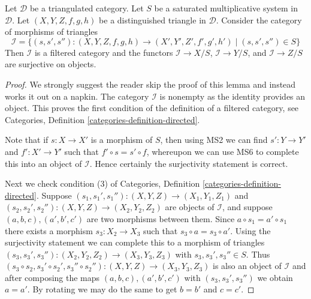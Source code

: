 \begin{lemma}
\label{lemma-limit-triangles}
Let $\mathcal{D}$ be a triangulated category.
Let $S$ be a saturated multiplicative system in $\mathcal{D}$.
Let $(X, Y, Z, f, g, h)$ be a distinguished triangle in $\mathcal{D}$.
Consider the category of morphisms of triangles
$$
\mathcal{I} =
\{(s, s', s'') : (X, Y, Z, f, g, h) \to (X', Y', Z', f', g', h')
\mid (s, s', s'') \in S\}
$$
Then $\mathcal{I}$ is a filtered category and the functors
$\mathcal{I} \to X/S$, $\mathcal{I} \to Y/S$, and $\mathcal{I} \to Z/S$
are surjective on objects.
\end{lemma}

\begin{proof}
We strongly suggest the reader skip the proof of this lemma and instead
works it out on a napkin.
The category $\mathcal{I}$ is nonempty as the identity provides an object.
This proves the first condition of the definition of a filtered category, see
Categories, Definition \ref{categories-definition-directed}.

\medskip\noindent
Note that if $s : X \to X'$ is a morphism of $S$, then using
MS2 we can find $s' : Y \to Y'$ and $f' : X' \to Y'$ such that
$f' \circ s = s' \circ f$, whereupon we can use MS6 to complete
this into an object of $\mathcal{I}$. Hence certainly the surjectivity
statement is correct.

\medskip\noindent
Next we check condition (3) of
Categories, Definition \ref{categories-definition-directed}.
Suppose $(s_1, s_1', s_1'') : (X, Y, Z) \to (X_1, Y_1, Z_1)$ and
$(s_2, s_2', s_2'') : (X, Y, Z) \to (X_2, Y_2, Z_2)$
are objects of $\mathcal{I}$, and suppose $(a, b, c), (a', b', c')$
are two morphisms between them. Since $a \circ s_1 = a' \circ s_1$
there exists a morphism $s_3 : X_2 \to X_3$ such that
$s_3 \circ a = s_3 \circ a'$. Using the surjectivity statement
we can complete this to a morphism of triangles
$(s_3, s_3', s_3'') : (X_2, Y_2, Z_2) \to (X_3, Y_3, Z_3)$
with $s_3, s_3', s_3'' \in S$. Thus
$(s_3 \circ s_2, s_3' \circ s_2', s_3'' \circ s_2'') :
(X, Y, Z) \to (X_3, Y_3, Z_3)$ is also an object of $\mathcal{I}$
and after composing the maps $(a, b, c), (a', b', c')$ with
$(s_3, s_3', s_3'')$ we obtain $a = a'$. By rotating we may do the
same to get $b = b'$ and $c = c'$.


\end{proof}
